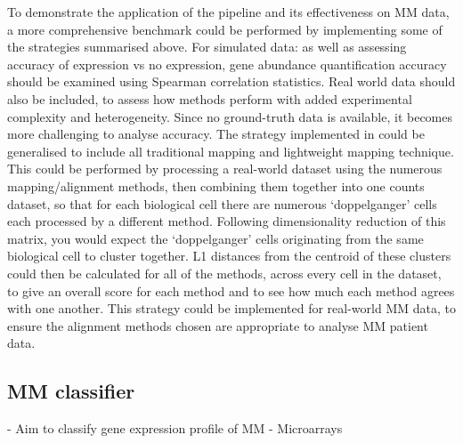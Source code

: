 To demonstrate the application of the pipeline and its effectiveness on MM data, a more comprehensive benchmark could be performed by implementing some of the strategies summarised above.
For simulated data: as well as assessing accuracy of expression vs no expression, gene abundance quantification accuracy should be examined using Spearman correlation statistics.
Real world data should also be included, to assess how methods perform with added experimental complexity and heterogeneity.
Since no ground-truth data is available, it becomes more challenging to analyse accuracy.
The strategy implemented in \cite{booeshaghi2021benchmarking} could be generalised to include all traditional mapping and lightweight mapping technique.
This could be performed by processing a real-world dataset using the numerous mapping/alignment methods, then combining them together into one counts dataset, so that for each biological cell there are numerous `doppelganger' cells each processed by a different method.
Following dimensionality reduction of this matrix, you would expect the `doppelganger' cells originating from the same biological cell to cluster together.
L1 distances from the centroid of these clusters could then be calculated for all of the methods, across every cell in the dataset, to give an overall score for each method and to see how much each method agrees with one another.
This strategy could be implemented for real-world MM data, to ensure the alignment methods chosen are appropriate to analyse MM patient data.

\subsection{MM classifier}
- Aim to classify gene expression profile of MM
- Microarrays

